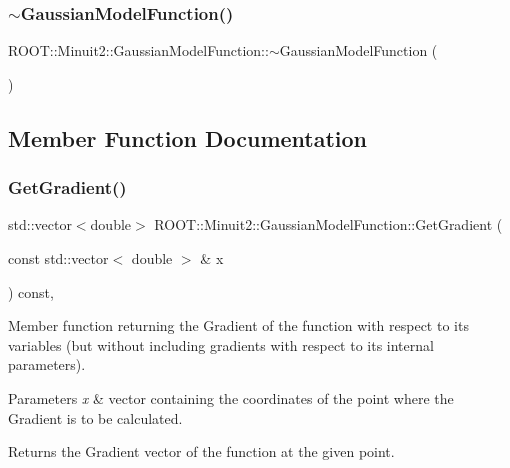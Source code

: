 \subsubsection{\texorpdfstring{$\sim$GaussianModelFunction()}{~GaussianModelFunction()}\hspace{0.1cm}{\footnotesize\ttfamily [2/2]}}
{\footnotesize\ttfamily R\+O\+O\+T\+::\+Minuit2\+::\+Gaussian\+Model\+Function\+::$\sim$\+Gaussian\+Model\+Function (\begin{DoxyParamCaption}{ }\end{DoxyParamCaption})\hspace{0.3cm}{\ttfamily [inline]}}



\subsection{Member Function Documentation}
\mbox{\label{classROOT_1_1Minuit2_1_1GaussianModelFunction_ac81a3c5531a291b8a9c3af533de07195}} 
\subsubsection{\texorpdfstring{GetGradient()}{GetGradient()}\hspace{0.1cm}{\footnotesize\ttfamily [1/2]}}
{\footnotesize\ttfamily std\+::vector$<$double$>$ R\+O\+O\+T\+::\+Minuit2\+::\+Gaussian\+Model\+Function\+::\+Get\+Gradient (\begin{DoxyParamCaption}\item[{const std\+::vector$<$ double $>$ \&}]{x }\end{DoxyParamCaption}) const\hspace{0.3cm}{\ttfamily [inline]}, {\ttfamily [virtual]}}

Member function returning the Gradient of the function with respect to its variables (but without including gradients with respect to its internal parameters).


\begin{DoxyParams}{Parameters}
{\em x} & vector containing the coordinates of the point where the Gradient is to be calculated.\\
\hline
\end{DoxyParams}
\begin{DoxyReturn}{Returns}
the Gradient vector of the function at the given point. 
\end{DoxyReturn}


